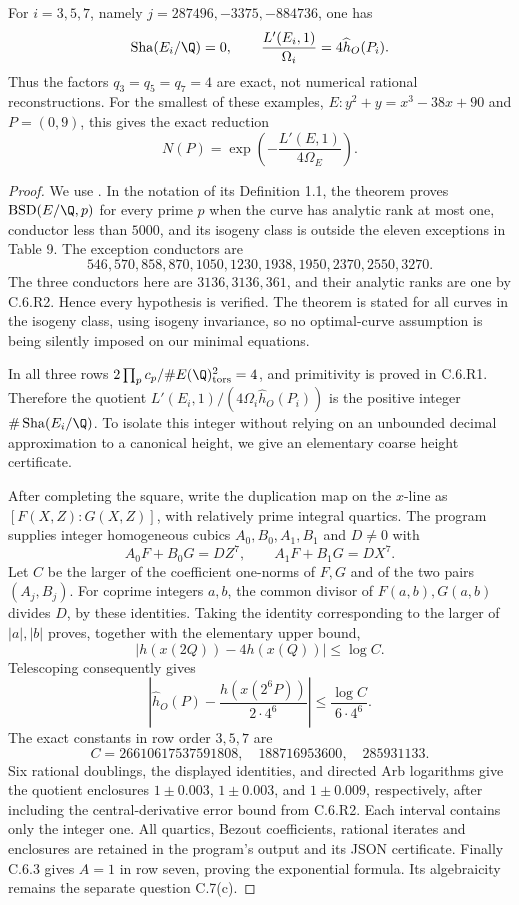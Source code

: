 \begin{proposition}\label{ari:C.6.R4}
For $i=3,5,7$, namely $j=287496,-3375,-884736$, one has
\[
 \operatorname{Sha}(E_i/\Q)=0,\qquad
 \frac{L'(E_i,1)}{\Omega_i}=4\widehat h_O(P_i).
\]
Thus the factors $q_3=q_5=q_7=4$ are exact, not numerical
rational reconstructions. For the smallest of these examples,
$E:y^2+y=x^3-38x+90$ and $P=(0,9)$, this gives the exact
reduction
\[
 N(P)=\exp\left(-\frac{L'(E,1)}{4\Omega_E}\right).
\]
\end{proposition}
\begin{proof}
We use \citet[Theorem 1.2 and Table 9]{miller2011}. In the
notation of its Definition 1.1, the theorem proves
$\mathrm{BSD}(E/\Q,p)$ for every prime $p$ when the curve has
analytic rank at most one, conductor less than $5000$, and
its isogeny class is outside the eleven exceptions in Table 9.
The exception conductors are
\[
546,570,858,870,1050,1230,1938,1950,2370,2550,3270.
\]
The three conductors here are $3136,3136,361$, and their
analytic ranks are one by C.6.R2. Hence every hypothesis is
verified. The theorem is stated for all curves in the isogeny
class, using isogeny invariance, so no optimal-curve assumption
is being silently imposed on our minimal equations.

In all three rows
$2\prod_pc_p/\#E(\Q)_{\rm tors}^2=4$, and primitivity is
proved in C.6.R1. Therefore the quotient
$L'(E_i,1)/(4\Omega_i\widehat h_O(P_i))$ is the positive
integer $\#\operatorname{Sha}(E_i/\Q)$. To isolate this integer
without relying on an unbounded decimal approximation to a
canonical height, we give an elementary coarse height certificate.

After completing the square, write the duplication map on the
$x$-line as $[F(X,Z):G(X,Z)]$, with relatively prime integral
quartics. The program
 supplies integer
homogeneous cubics $A_0,B_0,A_1,B_1$ and $D\ne0$ with
\[
 A_0F+B_0G=DZ^7,\qquad A_1F+B_1G=DX^7.
\]
Let $C$ be the larger of the coefficient one-norms of $F,G$
and of the two pairs $(A_j,B_j)$. For coprime integers $a,b$,
the common divisor of $F(a,b),G(a,b)$ divides $D$, by these
identities. Taking the identity corresponding to the larger
of $|a|,|b|$ proves, together with the elementary upper bound,
\[
 |h(x(2Q))-4h(x(Q))|\leq\log C.
\]
Telescoping consequently gives
\[
 \left|\widehat h_O(P)-\frac{h(x(2^6P))}{2\cdot4^6}\right|
 \leq\frac{\log C}{6\cdot4^6}.
\]
The exact constants in row order $3,5,7$ are
\[
 C=26610617537591808,\quad188716953600,\quad285931133.
\]
Six rational doublings, the displayed identities, and directed
Arb logarithms give the quotient enclosures
$1\pm0.003$, $1\pm0.003$, and $1\pm0.009$, respectively,
after including the central-derivative error bound from C.6.R2.
Each interval contains only the integer one. All quartics,
Bezout coefficients, rational iterates and enclosures are
retained in the program's output and its JSON certificate.
Finally C.6.3 gives $A=1$ in row seven, proving the exponential
formula. Its algebraicity remains the separate question C.7(c).
\end{proof}

